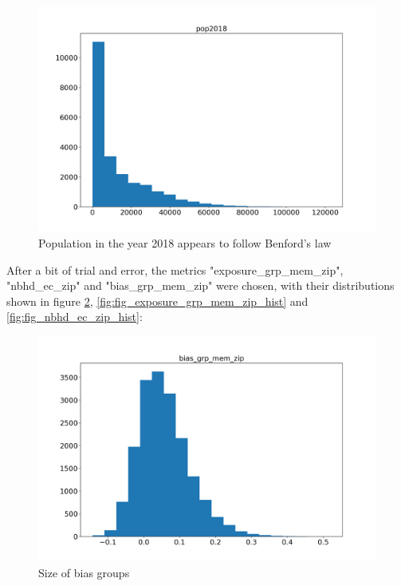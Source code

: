 \begin{figure}[H]
	\centering
	\includegraphics[width=0.9\linewidth]{images/pop2018_hist.png}
	\caption{Population in the year 2018 appears to follow Benford's law}
	\label{fig:fig_pop_2018}
\end{figure}


After a bit of trial and error, the metrics "exposure\_grp\_mem\_zip", "nbhd\_ec\_zip" and "bias\_grp\_mem\_zip" were chosen, with their distributions shown in figure \ref{fig:fig_bias_grp_mem_zip_hist}, \ref{fig:fig_exposure_grp_mem_zip_hist} and \ref{fig:fig_nbhd_ec_zip_hist}:




\begin{figure}[H]
	\centering
	\includegraphics[width=0.9\linewidth]{images/bias_grp_mem_zip_hist.png}
	\caption{Size of bias groups}
	\label{fig:fig_bias_grp_mem_zip_hist}
\end{figure}




